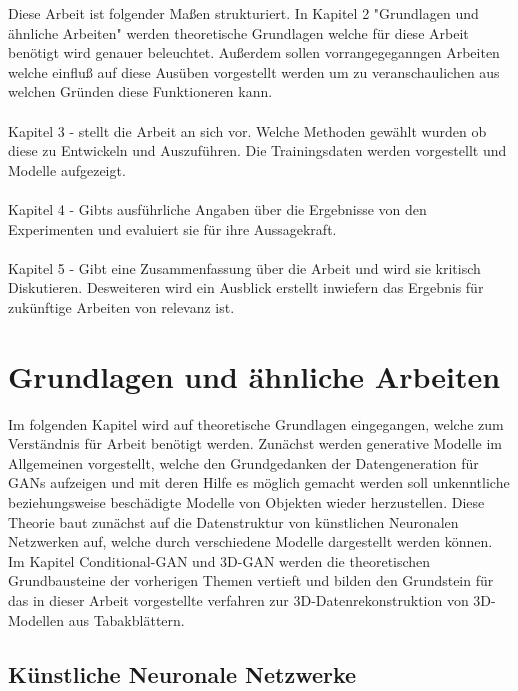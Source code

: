 \documentclass{llncs}
\begin{document}
Diese Arbeit ist folgender Maßen strukturiert. In Kapitel 2 "Grundlagen und ähnliche Arbeiten" werden theoretische Grundlagen welche für diese Arbeit benötigt wird genauer beleuchtet. Außerdem sollen vorrangegeganngen Arbeiten welche einfluß auf diese Ausüben vorgestellt werden um zu veranschaulichen aus welchen Gründen diese Funktioneren kann.
\\\\
Kapitel 3 - stellt die Arbeit an sich vor. Welche Methoden gewählt wurden ob diese zu Entwickeln und Auszuführen. Die Trainingsdaten werden vorgestellt und Modelle aufgezeigt.
\\\\
Kapitel 4 - Gibts  ausführliche Angaben über die Ergebnisse von den Experimenten und evaluiert sie für ihre Aussagekraft.
\\\\
Kapitel 5 - Gibt eine Zusammenfassung über die Arbeit und wird sie kritisch Diskutieren. Desweiteren wird ein Ausblick erstellt inwiefern das Ergebnis für zukünftige Arbeiten von relevanz ist. 

\section{Grundlagen und ähnliche Arbeiten}

Im folgenden Kapitel wird auf theoretische Grundlagen eingegangen, welche zum Verständnis für Arbeit benötigt werden. Zunächst werden  generative Modelle im Allgemeinen vorgestellt, welche den Grundgedanken der Datengeneration für GANs aufzeigen und mit deren Hilfe es möglich gemacht werden soll unkenntliche beziehungsweise beschädigte Modelle von Objekten wieder herzustellen. Diese Theorie baut zunächst auf die Datenstruktur von künstlichen Neuronalen Netzwerken auf, welche durch verschiedene Modelle dargestellt werden können. Im Kapitel Conditional-GAN und 3D-GAN werden die theoretischen Grundbausteine der vorherigen Themen vertieft und bilden den Grundstein für das in dieser Arbeit vorgestellte verfahren zur 3D-Datenrekonstruktion von 3D-Modellen aus Tabakblättern. 

\subsection{Künstliche Neuronale Netzwerke}
\end{document}
